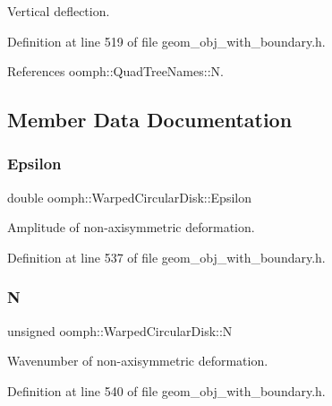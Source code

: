 Vertical deflection. 



Definition at line 519 of file geom\+\_\+obj\+\_\+with\+\_\+boundary.\+h.



References oomph\+::\+Quad\+Tree\+Names\+::N.



\subsection{Member Data Documentation}
\mbox{\label{classoomph_1_1WarpedCircularDisk_a1b247844e433658dd5b829220543ac78}} 
\subsubsection{\texorpdfstring{Epsilon}{Epsilon}}
{\footnotesize\ttfamily double oomph\+::\+Warped\+Circular\+Disk\+::\+Epsilon\hspace{0.3cm}{\ttfamily [private]}}



Amplitude of non-\/axisymmetric deformation. 



Definition at line 537 of file geom\+\_\+obj\+\_\+with\+\_\+boundary.\+h.

\mbox{\label{classoomph_1_1WarpedCircularDisk_ab2c77c18aedee5f502637dfbf96c0794}} 
\subsubsection{\texorpdfstring{N}{N}}
{\footnotesize\ttfamily unsigned oomph\+::\+Warped\+Circular\+Disk\+::N\hspace{0.3cm}{\ttfamily [private]}}



Wavenumber of non-\/axisymmetric deformation. 



Definition at line 540 of file geom\+\_\+obj\+\_\+with\+\_\+boundary.\+h.

